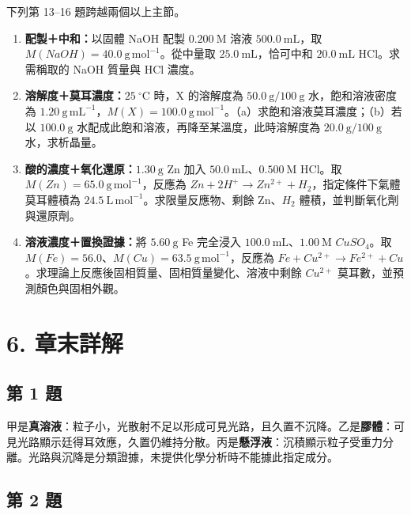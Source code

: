 \documentclass[11pt,a4paper]{article}
\providecommand{\tightlist}{%
  \setlength{\itemsep}{0pt}\setlength{\parskip}{0pt}}
\begin{document}
下列第 13--16 題跨越兩個以上主節。

\begin{enumerate}
\def\labelenumi{\arabic{enumi}.}
\setcounter{enumi}{12}
\tightlist
\item
  \textbf{配製＋中和：}以固體 NaOH 配製 \(0.200\ \mathrm M\) 溶液 \(500.0\ \mathrm{mL}\)，取 \(M(NaOH)=40.0\ \mathrm{g\,mol^{-1}}\)。從中量取 \(25.0\ \mathrm{mL}\)，恰可中和 \(20.0\ \mathrm{mL}\) HCl。求需稱取的 NaOH 質量與 HCl 濃度。
\item
  \textbf{溶解度＋莫耳濃度：}\(25\ ^\circ\mathrm C\) 時，X 的溶解度為 \(50.0\ \mathrm g/100\ \mathrm g\) 水，飽和溶液密度為 \(1.20\ \mathrm{g\,mL^{-1}}\)，\(M(X)=100.0\ \mathrm{g\,mol^{-1}}\)。（a）求飽和溶液莫耳濃度；（b）若以 \(100.0\ \mathrm g\) 水配成此飽和溶液，再降至某溫度，此時溶解度為 \(20.0\ \mathrm g/100\ \mathrm g\) 水，求析晶量。
\item
  \textbf{酸的濃度＋氧化還原：}\(1.30\ \mathrm g\) Zn 加入 \(50.0\ \mathrm{mL}\)、\(0.500\ \mathrm M\) HCl。取 \(M(Zn)=65.0\ \mathrm{g\,mol^{-1}}\)，反應為 \(Zn+2H^+\rightarrow Zn^{2+}+H_2\)，指定條件下氣體莫耳體積為 \(24.5\ \mathrm{L\,mol^{-1}}\)。求限量反應物、剩餘 Zn、\(H_2\) 體積，並判斷氧化劑與還原劑。
\item
  \textbf{溶液濃度＋置換證據：}將 \(5.60\ \mathrm g\) Fe 完全浸入 \(100.0\ \mathrm{mL}\)、\(1.00\ \mathrm M\) \(CuSO_4\)。取 \(M(Fe)=56.0\)、\(M(Cu)=63.5\ \mathrm{g\,mol^{-1}}\)，反應為 \(Fe+Cu^{2+}\rightarrow Fe^{2+}+Cu\)。求理論上反應後固相質量、固相質量變化、溶液中剩餘 \(Cu^{2+}\) 莫耳數，並預測顏色與固相外觀。
\end{enumerate}

\section{6. 章末詳解}\label{ux7ae0ux672bux8a73ux89e3}

\subsection{第 1 題}\label{ux7b2c-1-ux984c}

甲是\textbf{真溶液}：粒子小，光散射不足以形成可見光路，且久置不沉降。乙是\textbf{膠體}：可見光路顯示廷得耳效應，久置仍維持分散。丙是\textbf{懸浮液}：沉積顯示粒子受重力分離。光路與沉降是分類證據，未提供化學分析時不能據此指定成分。

\subsection{第 2 題}\label{ux7b2c-2-ux984c}
\end{document}
